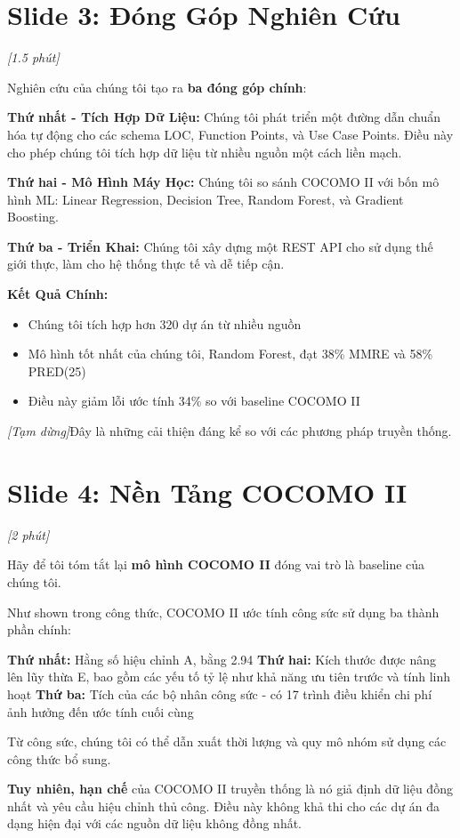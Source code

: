 \documentclass[12pt,a4paper]{article}
\newcommand{\slide}[1]{\section*{\textcolor{slidenum}{Slide #1}}}
\newcommand{\timing}[1]{\textcolor{timing}{\textit{[#1]}}}
\newcommand{\keypoint}[1]{\textcolor{keypoint}{\textbf{#1}}}
\newcommand{\pause}{\textit{[Tạm dừng]}}
\begin{document}
\slide{3: Đóng Góp Nghiên Cứu}
\timing{1.5 phút}

Nghiên cứu của chúng tôi tạo ra \keypoint{ba đóng góp chính}:

\textbf{Thứ nhất - Tích Hợp Dữ Liệu:} Chúng tôi phát triển một đường dẫn chuẩn hóa tự động cho các schema LOC, Function Points, và Use Case Points. Điều này cho phép chúng tôi tích hợp dữ liệu từ nhiều nguồn một cách liền mạch.

\textbf{Thứ hai - Mô Hình Máy Học:} Chúng tôi so sánh COCOMO II với bốn mô hình ML: Linear Regression, Decision Tree, Random Forest, và Gradient Boosting.

\textbf{Thứ ba - Triển Khai:} Chúng tôi xây dựng một REST API cho sử dụng thế giới thực, làm cho hệ thống thực tế và dễ tiếp cận.

\textbf{Kết Quả Chính:}
\begin{itemize}
    \item Chúng tôi tích hợp hơn 320 dự án từ nhiều nguồn
    \item Mô hình tốt nhất của chúng tôi, Random Forest, đạt 38\% MMRE và 58\% PRED(25)
    \item Điều này giảm lỗi ước tính 34\% so với baseline COCOMO II
\end{itemize}

\pause Đây là những cải thiện đáng kể so với các phương pháp truyền thống.

\slide{4: Nền Tảng COCOMO II}
\timing{2 phút}

Hãy để tôi tóm tắt lại \keypoint{mô hình COCOMO II} đóng vai trò là baseline của chúng tôi.

Như shown trong công thức, COCOMO II ước tính công sức sử dụng ba thành phần chính:

\textbf{Thứ nhất:} Hằng số hiệu chỉnh A, bằng 2.94
\textbf{Thứ hai:} Kích thước được nâng lên lũy thừa E, bao gồm các yếu tố tỷ lệ như khả năng ưu tiên trước và tính linh hoạt
\textbf{Thứ ba:} Tích của các bộ nhân công sức - có 17 trình điều khiển chi phí ảnh hưởng đến ước tính cuối cùng

Từ công sức, chúng tôi có thể dẫn xuất thời lượng và quy mô nhóm sử dụng các công thức bổ sung.

\textbf{Tuy nhiên, hạn chế} của COCOMO II truyền thống là nó giả định dữ liệu đồng nhất và yêu cầu hiệu chỉnh thủ công. Điều này không khả thi cho các dự án đa dạng hiện đại với các nguồn dữ liệu không đồng nhất.
\end{document}
